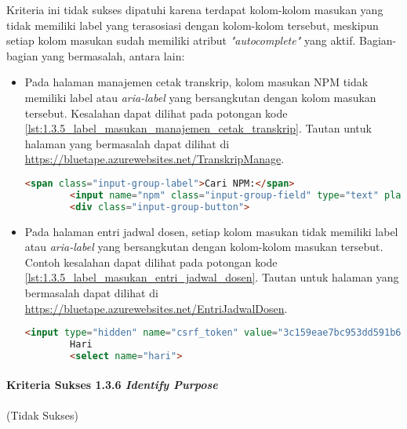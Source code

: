 Kriteria ini tidak sukses dipatuhi karena terdapat kolom-kolom masukan yang tidak memiliki label yang terasosiasi dengan kolom-kolom tersebut, meskipun setiap kolom masukan sudah memiliki atribut \textit{"autocomplete"} yang aktif. Bagian-bagian yang bermasalah, antara lain:
\begin{itemize}
    \item Pada halaman manajemen cetak transkrip, kolom masukan NPM tidak memiliki label atau \textit{aria-label} yang bersangkutan dengan kolom masukan tersebut. Kesalahan dapat dilihat pada potongan kode \ref{lst:1.3.5_label_masukan_manajemen_cetak_transkrip}. Tautan untuk halaman yang bermasalah dapat dilihat di \url{https://bluetape.azurewebsites.net/TranskripManage}.
    \begin{lstlisting}[frame=single, label={lst:1.3.5_label_masukan_manajemen_cetak_transkrip}, language=HTML, caption=Kriteria Sukses 1.3.5 - Tidak Terdapat Label pada Kolom Masukan di Halaman Manajemen Cetak Transkrip]
        <span class="input-group-label">Cari NPM:</span>
        <input name="npm" class="input-group-field" type="text" placeholder="2013730013" maxlength="10" minlength="10"/>
        <div class="input-group-button">
    \end{lstlisting}
    
    \item Pada halaman entri jadwal dosen, setiap kolom masukan tidak memiliki label atau \textit{aria-label} yang bersangkutan dengan kolom-kolom masukan tersebut. Contoh kesalahan dapat dilihat pada potongan kode \ref{lst:1.3.5_label_masukan_entri_jadwal_dosen}. Tautan untuk halaman yang bermasalah dapat dilihat di \url{https://bluetape.azurewebsites.net/EntriJadwalDosen}.
    \begin{lstlisting}[frame=single, label={lst:1.3.5_label_masukan_entri_jadwal_dosen}, language=HTML, caption=Kriteria Sukses 1.3.5 - Tidak Terdapat Label pada Kolom Masukan di Halaman Entri Jadwal Dosen]
        <input type="hidden" name="csrf_token" value="3c159eae7bc953dd591b679c080ed066" />
        Hari
        <select name="hari">
    \end{lstlisting}
\end{itemize}

\paragraph{Kriteria Sukses 1.3.6 \textit{Identify Purpose}}
\label{par:kepatuhan_bluetape_kriteria_sukses_1.3.6}
(Tidak Sukses)\\

